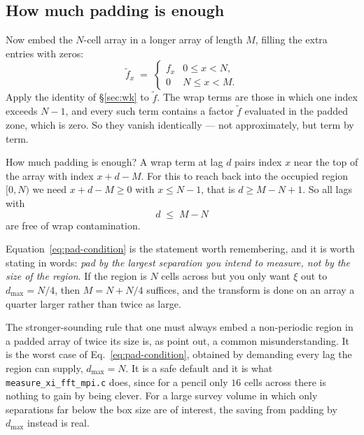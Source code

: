 \documentclass[12pt]{article}
\begin{document}
\subsection{How much padding is enough}\label{sec:pad-howmuch}

Now embed the $N$-cell array in a longer array of length $M$, filling the
extra entries with zeros:
\begin{equation}\label{eq:padded-array}
  \tilde f_x \;=\;
  \begin{cases}
    f_x & 0 \le x < N,\\
    0   & N \le x < M .
  \end{cases}
\end{equation}
Apply the identity of \S\ref{sec:wk} to $\tilde f$.  The wrap terms are those
in which one index exceeds $N-1$, and every such term contains a factor
$\tilde f$ evaluated in the padded zone, which is zero.  So they vanish
identically --- not approximately, but term by term.

How much padding is enough? A wrap term at lag $d$ pairs index $x$ near the
top of the array with index $x + d - M$.  For this to reach back into the
occupied region $[0,N)$ we need $x + d - M \ge 0$ with $x \le N-1$, that is
$d \ge M - N + 1$.  So all lags with
\begin{equation}\label{eq:pad-condition}
  d \;\le\; M - N
\end{equation}
are free of wrap contamination.

Equation~\eqref{eq:pad-condition} is the statement worth remembering, and it
is worth stating in words: \emph{pad by the largest separation you intend to
measure, not by the size of the region}.  If the region is $N$ cells across
but you only want $\xi$ out to $d_{\max} = N/4$, then
$M = N + N/4$ suffices, and the transform is done on an array a quarter
larger rather than twice as large.

The stronger-sounding rule that one must always embed a non-periodic region
in a padded array of twice its size is, as \citet{Slepian2016} point out, a
common misunderstanding.  It is the worst case of
Eq.~\eqref{eq:pad-condition}, obtained by demanding every lag the region can
supply, $d_{\max} = N$.  It is a safe default and it is what
\texttt{measure\_xi\_fft\_mpi.c} does, since for a pencil only $16$ cells
across there is nothing to gain by being clever.  For a large survey volume in
which only separations far below the box size are of interest, the saving
from padding by $d_{\max}$ instead is real.
\end{document}
